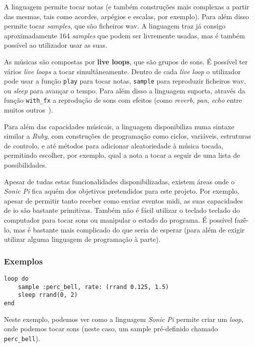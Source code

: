 A linguagem permite tocar notas (e também construções mais complexas a partir das mesmas, tais como acordes, arpégios e escalas, por exemplo). Para além disso permite tocar \textit{samples}, que são ficheiros \acrfull{wav}. A linguagem traz já consigo aproximadamente 164 \textit{samples} que podem ser livremente usadas, mas é também possível ao utilizador usar as suas.

As músicas são compostas por \textbf{live loops}, que são grupos de sons. É possível ter vários \textit{live loops} a tocar simultâneamente. Dentro de cada \textit{live loop} o utilizador pode usar a função \texttt{play} para tocar notas, \texttt{sample} para reproduzir ficheiros \acrshort{wav}, ou \textit{sleep} para avançar o tempo. Para além disso a linguagem suporta, através da função \texttt{with\_fx} a reprodução de sons com efeitos (como \textit{reverb}, \textit{pan}, \textit{echo} entre muitos outros~\cite{sonic-pi-fx}).

Para além das capacidades músicais, a linguagem disponibiliza numa sintaxe similar a \textit{Ruby}, com construções de programação como ciclos, variáveis, estruturas de controlo, e até métodos para adicionar aleatoriedade à música tocada, permitindo escolher, por exemplo, qual a nota a tocar a seguir de uma lista de possibilidades.

Apesar de tudas estas funcionalidades disponibilizadas, existem áreas onde o \textit{Sonic Pi} fica aquém dos objetivos pretendidos para este projeto. Por exemplo, apesar de permitir tanto receber como enviar eventos \acrshort{midi}, as suas capacidades de \acrfull{io} são bastante primitivas. Também não é fácil utilizar o teclado teclado do computador para tocar sons ou manipular o estado do programa. É possível fazê-lo, mas é bastante mais complicado do que seria de esperar (para além de exigir utilizar alguma linguagem de programação à parte).

\subsubsection{Exemplos}
\begin{lstlisting}[caption={Reproduzir um \textit{sample} com valores aleatórios}] 
loop do
    sample :perc_bell, rate: (rrand 0.125, 1.5)
    sleep rrand(0, 2)
end
\end{lstlisting}
Neste exemplo, podemos ver como a linguagem \textit{Sonic Pi} permite criar um \textit{loop}, onde podemos tocar sons (neste caso, um sample pré-definido chamado \texttt{perc\_bell}).

